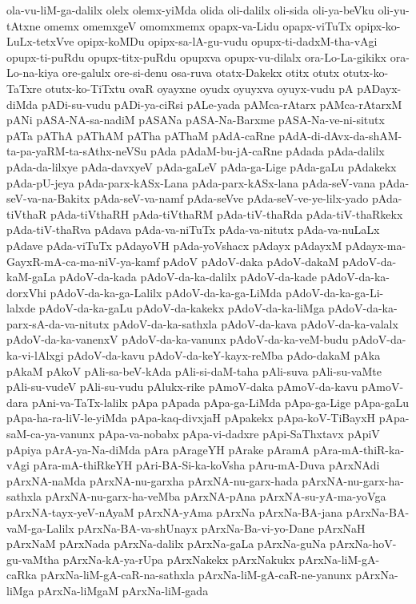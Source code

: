 {ola-vu-liM-ga-dalilx
olelx
olemx-yiMda
olida
oli-dalilx
oli-sida
oli-ya-beVku
oli-yu-tAtxne
omemx
omemxgeV
omomxmemx
opapx-va-Lidu
opapx-viTuTx
opipx-ko-LuLx-tetxVve
opipx-koMDu
opipx-sa-lA-gu-vudu
opupx-ti-dadxM-tha-vAgi
opupx-ti-puRdu
opupx-titx-puRdu
opupxva
opupx-vu-dilalx
ora-Lo-La-gikikx
ora-Lo-na-kiya
ore-galulx
ore-si-denu
osa-ruva
otatx-Dakekx
otitx
otutx
otutx-ko-TaTxre
otutx-ko-TiTxtu
ovaR
oyayxne
oyudx
oyuyxva
oyuyx-vudu
pA
pADayx-diMda
pADi-su-vudu
pADi-ya-ciRsi
pALe-yada
pAMca-rAtarx
pAMca-rAtarxM
pANi
pASA-NA-sa-nadiM
pASANa
pASA-Na-Barxme
pASA-Na-ve-ni-situtx
pATa
pAThA
pAThAM
pATha
pAThaM
pAdA-caRne
pAdA-di-dAvx-da-shAM-ta-pa-yaRM-ta-sAthx-neVSu
pAda
pAdaM-bu-jA-caRne
pAdada
pAda-dalilx
pAda-da-lilxye
pAda-davxyeV
pAda-gaLeV
pAda-ga-Lige
pAda-gaLu
pAdakekx
pAda-pU-jeya
pAda-parx-kASx-Lana
pAda-parx-kASx-lana
pAda-seV-vana
pAda-seV-va-na-Bakitx
pAda-seV-va-namf
pAda-seVve
pAda-seV-ve-ye-lilx-yado
pAda-tiVthaR
pAda-tiVthaRH
pAda-tiVthaRM
pAda-tiV-thaRda
pAda-tiV-thaRkekx
pAda-tiV-thaRva
pAdava
pAda-va-niTuTx
pAda-va-nitutx
pAda-va-nuLaLx
pAdave
pAda-viTuTx
pAdayoVH
pAda-yoVshacx
pAdayx
pAdayxM
pAdayx-ma-GayxR-mA-ca-ma-niV-ya-kamf
pAdoV
pAdoV-daka
pAdoV-dakaM
pAdoV-da-kaM-gaLa
pAdoV-da-kada
pAdoV-da-ka-dalilx
pAdoV-da-kade
pAdoV-da-ka-dorxVhi
pAdoV-da-ka-ga-Lalilx
pAdoV-da-ka-ga-LiMda
pAdoV-da-ka-ga-Li-lalxde
pAdoV-da-ka-gaLu
pAdoV-da-kakekx
pAdoV-da-ka-liMga
pAdoV-da-ka-parx-sA-da-va-nitutx
pAdoV-da-ka-sathxla
pAdoV-da-kava
pAdoV-da-ka-valalx
pAdoV-da-ka-vanenxV
pAdoV-da-ka-vanunx
pAdoV-da-ka-veM-budu
pAdoV-da-ka-vi-lAlxgi
pAdoV-da-kavu
pAdoV-da-keY-kayx-reMba
pAdo-dakaM
pAka
pAkaM
pAkoV
pAli-sa-beV-kAda
pAli-si-daM-taha
pAli-suva
pAli-su-vaMte
pAli-su-vudeV
pAli-su-vudu
pAlukx-rike
pAmoV-daka
pAmoV-da-kavu
pAmoV-dara
pAni-va-TaTx-lalilx
pApa
pApada
pApa-ga-LiMda
pApa-ga-Lige
pApa-gaLu
pApa-ha-ra-liV-le-yiMda
pApa-kaq-divxjaH
pApakekx
pApa-koV-TiBayxH
pApa-saM-ca-ya-vanunx
pApa-va-nobabx
pApa-vi-dadxre
pApi-SaThxtavx
pApiV
pApiya
pArA-ya-Na-diMda
pAra
pArageYH
pArake
pAramA
pAra-mA-thiR-ka-vAgi
pAra-mA-thiRkeYH
pAri-BA-Si-ka-koVsha
pAru-mA-Duva
pArxNAdi
pArxNA-naMda
pArxNA-nu-garxha
pArxNA-nu-garx-hada
pArxNA-nu-garx-ha-sathxla
pArxNA-nu-garx-ha-veMba
pArxNA-pAna
pArxNA-su-yA-ma-yoVga
pArxNA-tayx-yeV-nAyaM
pArxNA-yAma
pArxNa
pArxNa-BA-jana
pArxNa-BA-vaM-ga-Lalilx
pArxNa-BA-va-shUnayx
pArxNa-Ba-vi-yo-Dane
pArxNaH
pArxNaM
pArxNada
pArxNa-dalilx
pArxNa-gaLa
pArxNa-guNa
pArxNa-hoV-gu-vaMtha
pArxNa-kA-ya-rUpa
pArxNakekx
pArxNakukx
pArxNa-liM-gA-caRka
pArxNa-liM-gA-caR-na-sathxla
pArxNa-liM-gA-caR-ne-yanunx
pArxNa-liMga
pArxNa-liMgaM
pArxNa-liM-gada
}
